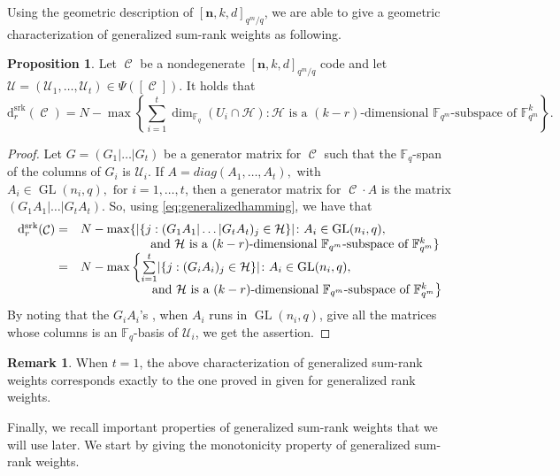 \documentclass[11pt]{amsart}
\DeclareMathOperator{\C}{\mathcal{C}}
\DeclareMathOperator{\GL}{GL}
\theoremstyle{definition}
\newtheorem{proposition}[theorem]{Proposition}
\newtheorem{remark}[theorem]{Remark}
\newcommand{\F}{{\mathbb F}}
\newcommand{\ds}{\mathrm{d}^{\mathrm{srk}}}
\newcommand{\bfn}{\mathbf {n}}
\newcommand{\Fmnkd}{[\bfn,k,d]_{q^m/q}}
\begin{document}
Using the geometric description of $\Fmnkd$, we are able to give a geometric characterization of generalized sum-rank weights as following.

\begin{proposition} \label{prop:geogeneralizedweights}
Let $\C$ be a nondegenerate $\Fmnkd$ code and let $\mathcal{U}=(\mathcal{U}_1,\ldots, \mathcal{U}_t) \in \Psi([\C])$. It holds that
\[
\ds_r(\C)= N- \max \left\{ \sum_{i=1}^t \dim_{\F_q}(U_i \cap \mathcal{H}) \colon \mathcal{H} \mbox{ is a } (k-r)\mbox{-dimensional } \F_{q^m}\mbox{-subspace of } \F_{q^m}^k \right\}. 
\]

\end{proposition} 
\begin{proof}
Let $G=(G_1 | \ldots |G_t)$ be a generator matrix for $\C$ such that the $\F_q$-span of the columns of $G_i$ is $\mathcal{U}_i$. If $A=diag(A_1,\ldots,A_t),$ with $ A_i \in \GL(n_i,q), \mbox{ for } i=1,\ldots,t$, then a generator matrix for $ \C \cdot A$ is the matrix $(G_1A_1 | \ldots | G_t A_t)$. So, using \eqref{eq:generalizedhamming}, we have that
\[
\begin{array}{rl}

\ds_r(\C) = &  N-\max \{ 
\lvert \{j:   (G_1A_1 | \ldots  | G_t A_t)_{j} \in \mathcal{H} \} \rvert  \colon  A_i \in \GL(n_i,q), 
\\ & \hskip 2 cm \mbox{and } \mathcal{H} \mbox{ is a }(k-r)\mbox{-dimensional } \F_{q^m}\mbox{-subspace of } \F_{q^m}^k \}
 \\
= &  N-\max \left\{ 
 \sum\limits_{i=1}^t \lvert \{j:   (G_iA_i)_{j} \in \mathcal{H} \} \rvert  \colon  A_i \in \GL(n_i,q), 
 \right. \\ &  \hskip 2 cm \left. 
 \mbox{and } \mathcal{H} \mbox{ is a }(k-r)\mbox{-dimensional } \F_{q^m}\mbox{-subspace of } \F_{q^m}^k  \right\}
 \\
\end{array}
\]
By noting that the $G_iA_i$'s , when $A_i$ runs in $\GL(n_i,q)$, give all the matrices whose columns is an $\F_q$-basis of $\mathcal{U}_i$, we get the assertion.
\end{proof}

\begin{remark}
    When $t=1$, the above characterization of generalized sum-rank weights corresponds exactly to the one proved in \cite{Randrianarisoa2020ageometric} given for generalized rank weights.
\end{remark}


Finally, we recall important properties of generalized sum-rank weights that we will use later. We start by giving the monotonicity property of generalized sum-rank weights.
\end{document}
